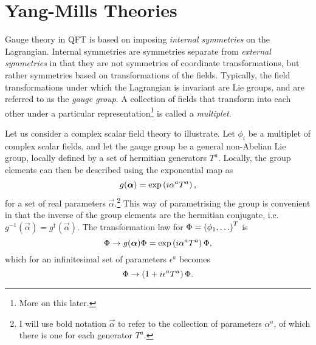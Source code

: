 \documentclass[../main.tex]{subfiles}
\begin{document}





\section{Yang-Mills Theories}
\label{qft:sec:yang-mills}

Gauge theory in QFT is based on imposing \emph{internal symmetries} on the Lagrangian.
Internal symmetries are symmetries separate from \emph{external symmetries} in that they are not symmetries of coordinate transformations, but rather symmetries based on transformations of the fields.
Typically, the field transformations under which the Lagrangian is invariant are Lie groups, and are referred to as the \emph{gauge group}.
A collection of fields that transform into each other under a particular representation\footnote{More on this later.} is called a \emph{multiplet}.

Let us consider a complex scalar field theory to illustrate.
Let \(\phi_i\) be a multiplet of complex scalar fields, and let the gauge group be a general non-Abelian Lie group, locally defined by a set of hermitian generators \(T^a\).
Locally, the group elements can then be described using the exponential map as\needcite\
\begin{equation}
  \label{qft:eq:exponential_map}
  g(\boldsymbol{\alpha}) = \operatorname{exp}\left(i \alpha^a T^a\right),
\end{equation}
for a set of real parameters \(\vec{\alpha}\).\footnote{I will use bold
  notation \(\vec\alpha\) to refer to the collection of parameters
  \(\alpha^a\), of which there is one for each generator \(T^a\).}
This way of parametrising the group is convenient in that the inverse of the group elements are the hermitian conjugate, i.e.\ \(g^{-1}(\vec\alpha) = g^\dagger(\vec{\alpha})\).
The transformation law for \(\Phi = \left(\phi_1, \ldots\right)^T\) is
\begin{equation}
  \label{qft:eq:gauge_transformation}
  \Phi \to g(\boldsymbol{\alpha}) \Phi = \operatorname{exp}\left(i \alpha^a T^a\right) \Phi,
\end{equation}
which for an infinitesimal set of parameters \(\epsilon^a\) becomes
\begin{equation}
  \Phi \to \left(1 + i \epsilon^a T^a\right) \Phi.
\end{equation}
\medskip
\end{document}
